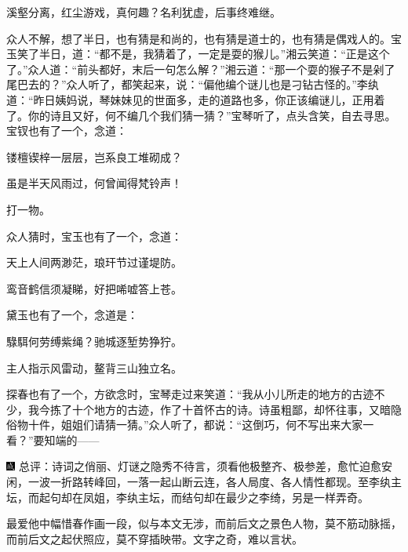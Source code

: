 溪壑分离，红尘游戏，真何趣？名利犹虚，后事终难继。

众人不解，想了半日，也有猜是和尚的，也有猜是道士的，也有猜是偶戏人的。宝玉笑了半日，道：``都不是，我猜着了，一定是耍的猴儿。''湘云笑道：``正是这个了。''众人道：``前头都好，末后一句怎么解？''湘云道：``那一个耍的猴子不是剁了尾巴去的？''众人听了，都笑起来，说：``偏他编个谜儿也是刁钻古怪的。''李纨道：``昨日姨妈说，琴妹妹见的世面多，走的道路也多，你正该编谜儿，正用着了。你的诗且又好，何不编几个我们猜一猜？''宝琴听了，点头含笑，自去寻思。宝钗也有了一个，念道：

镂檀锲梓一层层，岂系良工堆砌成？

虽是半天风雨过，何曾闻得梵铃声！

打一物。

众人猜时，宝玉也有了一个，念道：

天上人间两渺茫，琅玕节过谨堤防。

鸾音鹤信须凝睇，好把唏嘘答上苍。

黛玉也有了一个，念道是：

騄駬何劳缚紫绳？驰城逐堑势狰狞。

主人指示风雷动，鳌背三山独立名。

探春也有了一个，方欲念时，宝琴走过来笑道：``我从小儿所走的地方的古迹不少，我今拣了十个地方的古迹，作了十首怀古的诗。诗虽粗鄙，却怀往事，又暗隐俗物十件，姐姐们请猜一猜。''众人听了，都说：``这倒巧，何不写出来大家一看？''要知端的------

{\includegraphics[width=3mm]{../Images/00005}  \kaishu 总评：诗词之俏丽、灯谜之隐秀不待言，须看他极整齐、极参差，愈忙迫愈安闲，一波一折路转峰回，一落一起山断云连，各人局度、各人情性都现。至李纨主坛，而起句却在凤姐，李纨主坛，而结句却在最少之李绮，另是一样弄奇。}

{最爱他中幅惜春作画一段，似与本文无涉，而前后文之景色人物，莫不筋动脉摇，而前后文之起伏照应，莫不穿插映带。文字之奇，难以言状。}
